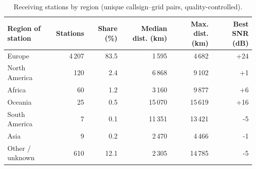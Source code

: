 \begin{table}[htbp]\centering\small
\caption{Receiving stations by region (unique callsign--grid pairs, quality-controlled).}\label{tab:zones}
\begin{tabular}{lrrrrr}
\toprule
Region of station & Stations & Share (\%) & Median dist. (km) & Max. dist. (km) & Best SNR (dB) \\
\midrule
Europe & 4\,207 & 83.5 & 1\,595 & 4\,682 & +24 \\
North America & 120 & 2.4 & 6\,868 & 9\,102 & +1 \\
Africa & 60 & 1.2 & 3\,160 & 9\,877 & +6 \\
Oceania & 25 & 0.5 & 15\,070 & 15\,619 & +16 \\
South America & 7 & 0.1 & 11\,351 & 13\,421 & -5 \\
Asia & 9 & 0.2 & 2\,470 & 4\,466 & -1 \\
Other / unknown & 610 & 12.1 & 2\,305 & 14\,785 & -5 \\
\bottomrule
\end{tabular}
\end{table}
